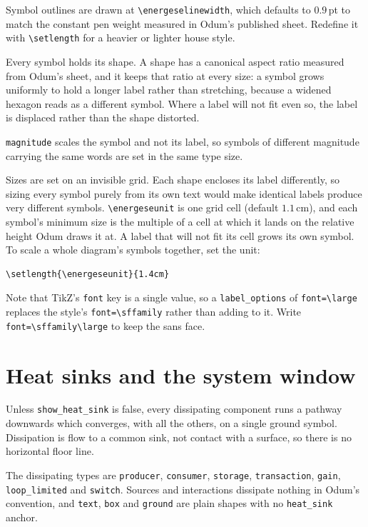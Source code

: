 \documentclass{article}
\begin{document}
Symbol outlines are drawn at \verb|\energeselinewidth|, which defaults to
$0.9$\,pt to match the constant pen weight measured in Odum's published sheet.
Redefine it with \verb|\setlength| for a heavier or lighter house style.

Every symbol holds its shape. A shape has a canonical aspect ratio measured from
Odum's sheet, and it keeps that ratio at every size: a symbol grows uniformly to
hold a longer label rather than stretching, because a widened hexagon reads as a
different symbol. Where a label will not fit even so, the label is displaced
rather than the shape distorted.

\texttt{magnitude} scales the symbol and not its label, so symbols of different
magnitude carrying the same words are set in the same type size.

Sizes are set on an invisible grid. Each shape encloses its label differently,
so sizing every symbol purely from its own text would make identical labels
produce very different symbols. \verb|\energeseunit| is one grid cell
(default $1.1$\,cm), and each symbol's minimum size is the multiple of a cell
at which it lands on the relative height Odum draws it at. A label that will not
fit its cell grows its own symbol. To scale a whole diagram's symbols together,
set the unit:

\begin{verbatim}
\setlength{\energeseunit}{1.4cm}
\end{verbatim}

Note that TikZ's \texttt{font} key is a single value, so a
\texttt{label\_options} of \verb|font=\large| replaces the style's
\verb|font=\sffamily| rather than adding to it. Write
\verb|font=\sffamily\large| to keep the sans face.

\section{Heat sinks and the system window}

Unless \texttt{show\_heat\_sink} is false, every dissipating component runs a
pathway downwards which converges, with all the others, on a single ground
symbol. Dissipation is flow to a common sink, not contact with a surface, so
there is no horizontal floor line.

The dissipating types are \texttt{producer}, \texttt{consumer},
\texttt{storage}, \texttt{transaction}, \texttt{gain},
\texttt{loop\_limited} and \texttt{switch}. Sources and interactions dissipate
nothing in Odum's convention, and \texttt{text}, \texttt{box} and
\texttt{ground} are plain shapes with no \texttt{heat\_sink} anchor.
\end{document}
